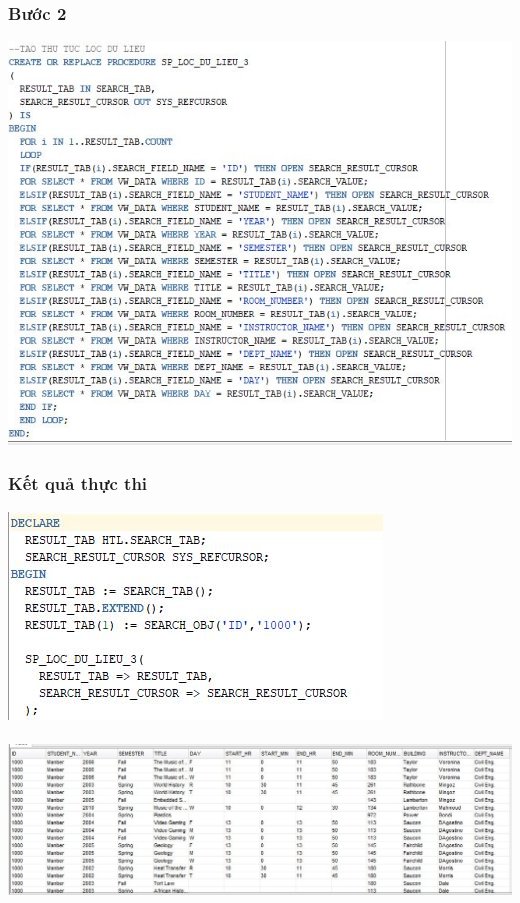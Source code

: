 \documentclass[12pt,a4paper]{report}
\begin{document}
\subsubsection{Bước 2}
\includegraphics[scale=.92]{b3o2.jpg}
\subsubsection{Kết quả thực thi}
\includegraphics[scale=1]{rb3o.jpg}\\\\
\includegraphics[scale=.55]{kb3o.jpg}
\end{document}
